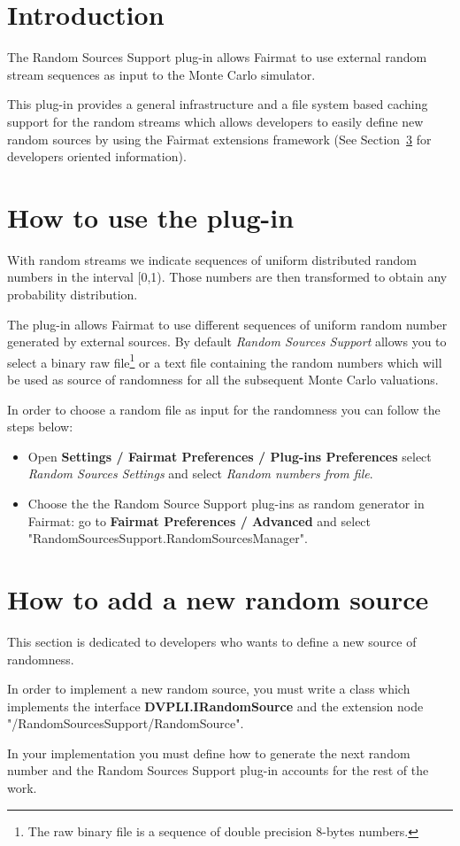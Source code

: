 \newcommand{\pluginName}{Random Sources Support}
\newcommand{\pluginVersion}{1.0}




\PluginTitle{\pluginName}{\pluginVersion}

\section{Introduction}

The Random Sources Support plug-in allows Fairmat to use external random stream sequences as input to the Monte Carlo simulator.

This plug-in provides a general infrastructure and a file system based caching support for the random streams which allows developers to easily define new random sources by using the Fairmat extensions framework (See Section~\ref{sec.dev} for developers oriented information). 

\section{How to use the plug-in}

With random streams we indicate sequences of uniform distributed random numbers in the interval [0,1). Those numbers are then transformed to obtain any probability distribution.

The plug-in allows Fairmat to use different sequences of uniform random number generated by external sources. 
By default \emph{Random Sources Support} allows you to select a binary raw file\footnote{The raw binary file is a sequence of double precision 8-bytes numbers.} or a text file containing the random numbers which will be used as source of randomness for all the subsequent Monte Carlo valuations.

In order to choose a random file as input for the randomness you can follow the steps below:

\begin{itemize}
\item Open \textbf{Settings / Fairmat Preferences / Plug-ins Preferences} select \emph{Random Sources Settings} and select \emph{Random numbers from file}.
\item Choose the  the Random Source Support plug-ins as random generator in Fairmat: go to \textbf{Fairmat Preferences / Advanced} and select "RandomSourcesSupport.RandomSourcesManager".
\end{itemize}

\section{How to add a new random source}
\label{sec.dev}
This section is dedicated to developers who wants to define a new source of randomness.

In order to implement a new random source, you must write a
class which implements the interface \textbf{DVPLI.IRandomSource} and the extension node "/RandomSourcesSupport/RandomSource". 

In your implementation you must define how to generate the next random number and the Random Sources Support plug-in accounts for the rest of the work.


